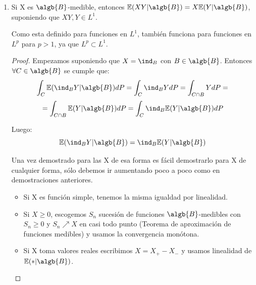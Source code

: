 \documentclass{apuntes}
\begin{document}
\begin{enumerate}
\begin{proof}
Para el siguiente paso lo único que hacemos es aplicar la definición de esperanza condicionada (el punto 2: $\forall B \in \algb{B}$, $\int_{B}\mathbb{E}(X|\algb{B})dP=\int_{B}XdP$):

\[
\lim_{n \rightarrow \infty}\int_B Y_ndP \leq \lim_{n \rightarrow \infty}\int_{\Omega} Y_ndP =
\]

Y otra vez usamos el TCD:
\[
= \int_B \lim_{n \rightarrow \infty} Y_ndP = 0
\]

Ya que $0 \leq X_n \nearrow X$ y por tanto $Y_n = X-X_n \searrow 0 $. Y con esto lo hemos demostrado en casi todo punto.

Ahora vamos a ver que se cumple en $L^1$, es decir que:
\[
\lim_{n \rightarrow \infty} \mathbb{E}(X_n|\algb{B}) - \mathbb{E}(X|\algb{B}) = \lim_{n \rightarrow \infty} \mathbb{E}(X-X_n|\algb{B}) = 0 \text{ en } L^1
\]

Por tanto:
\[
 \lim_{n \rightarrow \infty} \norm{\mathbb{E}(X-X_n|\algb{B})}_1 = \lim_{n \rightarrow \infty} \norm{\mathbb{E}(X|\algb{B}) - \mathbb{E}(X_n|\algb{B})}_1 =
\]

\[
= \lim_{n \rightarrow \infty} \mathbb{E}\abs{\mathbb{E}(Y_n|\algb{B})} = \lim_{n \rightarrow \infty} \mathbb{E}(Y_n) \text{ y por el TCD = }  \mathbb{E}(\lim_{n \rightarrow \infty}Y_n)=0
\]
\end{proof}
\item Si X es $\algb{B}$-medible, entonces $\mathbb{E}(XY|\algb{B}) = X\mathbb{E}(Y|\algb{B})$, suponiendo que $XY,Y \in L^1$.

\obs Como esta definido para funciones en $L^1$, también funciona para funciones en $L^p$ para $p>1$, ya que $L^p \subset L^1$.
\begin{proof}
Empezamos suponiendo que $X=\ind_B$ con $B \in \algb{B}$. Entonces $\forall C \in \algb{B}$ se cumple que:
\[
\int_C \mathbb{E}(\ind_BY|\algb{B})dP = \int_C \ind_BYdP=\int_{C\cap B} YdP =
\]
\[
 =\int_{C\cap B} \mathbb{E}(Y|\algb{B})dP = \int_C \ind_B\mathbb{E}(Y|\algb{B})dP
\]

Luego:
\[
\mathbb{E}(\ind_BY|\algb{B}) = \ind_B\mathbb{E}(Y|\algb{B})
\]

Una vez demostrado para las X de esa forma es fácil demostrarlo para X de cualquier forma, sólo debemos ir aumentando poco a poco como en demostraciones anteriores.
\begin{itemize}
\item Si X es función simple, tenemos la misma igualdad por linealidad.
\item Si $X \geq 0$, escogemos $S_n$ sucesión de funciones $\algb{B}$-medibles con $S_n\geq 0$ y $S_n \nearrow X$ en casi todo punto (Teorema de aproximación de funciones medibles) y usamos la convergencia monótona.
\item Si X toma valores reales escribimos $X=X_+ - X_-$ y usamos linealidad de $\mathbb{E}(*|\algb{B})$.


\end{itemize}
\end{proof}
\end{enumerate}
\end{document}
